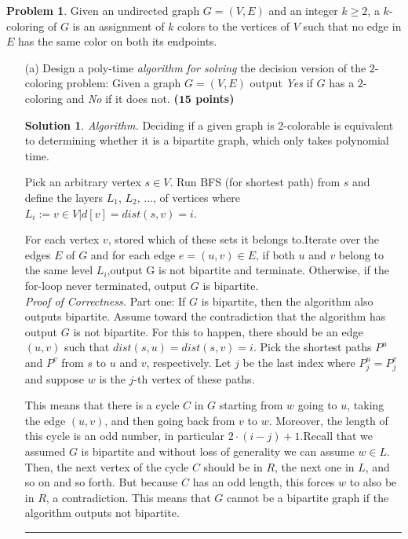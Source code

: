 \documentclass{article}
\theoremstyle{definition}
\newtheorem{problem}{Problem}
\def\fline{\rule{0.75\linewidth}{0.5pt}}
\newcommand{\finishline}{\begin{center}\fline\end{center}}
\newtheorem*{solution*}{Solution}
\newenvironment{solution}{\begin{solution*}}{{\finishline} \end{solution*}}
\newcommand{\grade}[1]{\hfill{\textbf{($\mathbf{#1}$ points)}}}
\begin{document}
\begin{problem}\label{prob}
 	Given an undirected graph $G=(V,E)$ and an integer $k \geq 2$, a $k$-coloring of $G$ is an assignment of $k$ colors to the vertices of $V$ such that no edge in $E$ has the same color on both its endpoints. 
	
	
	\begin{itemize}
		\item[(a)] Design a poly-time \emph{algorithm for solving} the decision version of the $2$-coloring problem: Given a graph $G=(V,E)$ output \emph{Yes} if $G$ has a $2$-coloring and \emph{No} if it does not. \grade{15}
		
\begin{solution}
		
	\emph{Algorithm.} Deciding if a given graph is 2-colorable is equivalent to determining whether it is a bipartite graph, which only takes polynomial time. 
	
	Pick  an  arbitrary  vertex $s \in V$.   Run  BFS  (for  shortest  path)  from $s$ and  define  the  layers $L_1$, $L_2$, ..., of vertices where $L_i := { v \in V | d[v] = dist(s, v) = i}$. 
	
	For each vertex $v$, stored which of these sets it belongs to.Iterate over the edges $E$ of $G$ and for each edge $e = (u, v) \in E$, if both $u$ and $v$ belong to the same level $L_i$,output G is not bipartite and terminate.  Otherwise, if the for-loop never terminated, output $G$ is bipartite. \\
	
	\emph{Proof of Correctness.} Part one: If $G$ is bipartite, then the algorithm also outputs bipartite.  Assume toward the contradiction that the algorithm has output $G$ is not bipartite.  For this to happen, there should be an edge $(u, v)$ such that $dist(s, u) = dist(s, v) = i$.  Pick the shortest paths $P^u$ and $P^v$ from $s$ to $u$ and $v$, respectively. Let $j$ be the last index where $P^u_j = P^v_j$ and suppose $w$ is the $j$-th vertex of these paths.
	
	This means that there is a cycle $C$ in $G$ starting from $w$ going to $u$, taking the edge $(u, v)$, and then going back from $v$ to $w$.  Moreover, the length of this cycle is an odd number, in particular $2 \cdot (i-j) + 1$.Recall that we assumed $G$ is bipartite and without loss of generality we can assume $w \in L$.  Then, the next vertex of the cycle $C$ should be in $R$, the next one in $L$, and so on and so forth.  But because $C$ has an odd length, this forces $w$ to also be in $R$, a contradiction.  This means that $G$ cannot be a bipartite graph if the algorithm outputs not bipartite.
	

\end{solution}
\end{itemize}
\end{problem}
\end{document}
